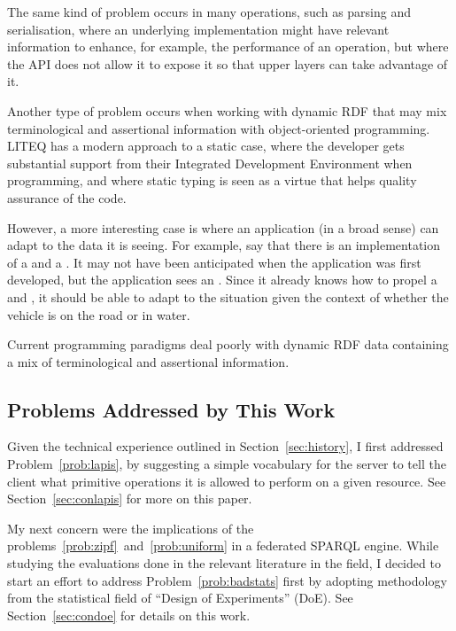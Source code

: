 The same kind of problem occurs in many operations, such as parsing
and serialisation, where an underlying implementation might have
relevant information to enhance, for example, the performance of an operation,
but where the API does not allow it to expose it so that upper layers
can take advantage of it.

Another type of problem occurs when working with dynamic RDF that may
mix terminological and assertional information with object-oriented
programming. LITEQ \cite{leinberger2014semantic} has a modern approach
to a static case, where the developer gets substantial support from
their Integrated Development Environment when programming, and where
static typing is seen as a virtue that helps quality assurance of the
code.

However, a more interesting case is where an application (in a broad
sense) can adapt to the data it is seeing. For example, say that there
is an implementation of a  and a . It may
not have been anticipated when the application was first developed,
but the application sees an . Since it
already knows how to propel a  and , it
should be able to adapt to the situation given the context of whether
the vehicle is on the road or in water.

\begin{problem}\label{prob:dynaprog}
Current programming paradigms deal poorly with dynamic RDF data
containing a mix of terminological and assertional information.
\end{problem}


\subsection{Problems Addressed by This Work}\label{sec:probaddress}

Given the technical experience outlined in Section~\ref{sec:history},
I first addressed Problem~\ref{prob:lapis}, by suggesting a simple
vocabulary for the server to tell the client what primitive operations
it is allowed to perform on a given resource. See
Section~\ref{sec:conlapis} for more on this paper.

My next concern were the implications of the
problems~\ref{prob:zipf}~and~\ref{prob:uniform} in a federated SPARQL
engine. While studying the evaluations done in the relevant literature
in the field, I decided to start an effort to address
Problem~\ref{prob:badstats} first by adopting methodology from the
statistical field of ``Design of Experiments'' (DoE). See
Section~\ref{sec:condoe} for details on this work.

